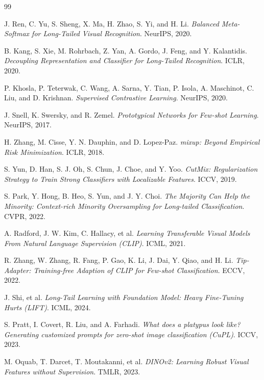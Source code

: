 \begin{thebibliography}{99}

J. Ren, C. Yu, S. Sheng, X. Ma, H. Zhao, S. Yi, and H. Li.
\textit{Balanced Meta-Softmax for Long-Tailed Visual Recognition}.
NeurIPS, 2020.

B. Kang, S. Xie, M. Rohrbach, Z. Yan, A. Gordo, J. Feng, and Y. Kalantidis.
\textit{Decoupling Representation and Classifier for Long-Tailed Recognition}.
ICLR, 2020.

P. Khosla, P. Teterwak, C. Wang, A. Sarna, Y. Tian, P. Isola, A. Maschinot, C. Liu, and D. Krishnan.
\textit{Supervised Contrastive Learning}.
NeurIPS, 2020.

J. Snell, K. Swersky, and R. Zemel.
\textit{Prototypical Networks for Few-shot Learning}.
NeurIPS, 2017.

H. Zhang, M. Cisse, Y. N. Dauphin, and D. Lopez-Paz.
\textit{mixup: Beyond Empirical Risk Minimization}.
ICLR, 2018.

S. Yun, D. Han, S. J. Oh, S. Chun, J. Choe, and Y. Yoo.
\textit{CutMix: Regularization Strategy to Train Strong Classifiers with Localizable Features}.
ICCV, 2019.

S. Park, Y. Hong, B. Heo, S. Yun, and J. Y. Choi.
\textit{The Majority Can Help the Minority: Context-rich Minority Oversampling for Long-tailed Classification}.
CVPR, 2022.

A. Radford, J. W. Kim, C. Hallacy, et al.
\textit{Learning Transferable Visual Models From Natural Language Supervision (CLIP)}.
ICML, 2021.

R. Zhang, W. Zhang, R. Fang, P. Gao, K. Li, J. Dai, Y. Qiao, and H. Li.
\textit{Tip-Adapter: Training-free Adaption of CLIP for Few-shot Classification}.
ECCV, 2022.

J. Shi, et al.
\textit{Long-Tail Learning with Foundation Model: Heavy Fine-Tuning Hurts (LIFT)}.
ICML, 2024.

S. Pratt, I. Covert, R. Liu, and A. Farhadi.
\textit{What does a platypus look like? Generating customized prompts for zero-shot image classification (CuPL)}.
ICCV, 2023.

M. Oquab, T. Darcet, T. Moutakanni, et al.
\textit{DINOv2: Learning Robust Visual Features without Supervision}.
TMLR, 2023.


\end{thebibliography}
